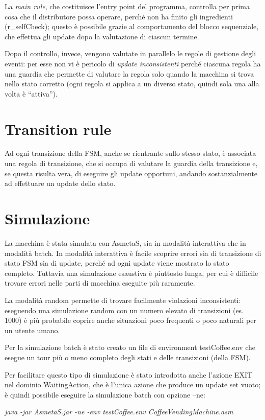 La \textit{main rule}, che costituisce l’entry point del programma, controlla per prima cosa che il distributore possa operare, perché non ha finito gli ingredienti (r_selfCheck); questo è possibile grazie al comportamento del blocco sequenziale, che effettua gli update dopo la valutazione di ciascun termine. 

Dopo il controllo, invece, vengono valutate in parallelo le regole di gestione degli eventi: per esse non vi è pericolo di \textit{update inconsistenti} perché ciascuna regola ha una guardia che permette di valutare la regola solo quando la macchina si trova nello stato corretto (ogni regola si applica a un diverso stato, quindi sola una alla volta è “attiva”).

\section{Transition rule}
Ad ogni transizione della FSM, anche se rientrante sullo stesso stato, è associata una regola di transizione, che si occupa di valutare la guardia della transizione e, se questa risulta vera, di eseguire gli update opportuni, andando sostanzialmente ad effettuare un update dello stato.


\section{Simulazione}
La macchina è stata simulata con AsmetaS, sia in modalità interattiva che in modalità batch.
In modalità interattiva è facile scoprire errori sia di transizione di stato FSM sia di update, perché ad ogni update viene mostrato lo stato completo. Tuttavia una simulazione esaustiva è piuttosto lunga, per cui è difficile trovare errori nelle parti di macchina eseguite più raramente.

La modalità random permette di trovare facilmente violazioni inconsistenti: eseguendo una simulazione random con un numero elevato di transizioni (es. 1000) è più probabile coprire anche situazioni poco frequenti o poco naturali per un utente umano.

Per la simulazione batch è stato creato un file di environment testCoffee.env che esegue un tour più o meno completo degli stati e delle transizioni (della FSM).

Per facilitare questo tipo di simulazione è stato introdotta anche l’azione EXIT nel dominio WaitingAction, che è l’unica azione che produce un update set vuoto; è quindi possibile eseguire la simulazione batch con opzione –ne:

\textit{java -jar AsmetaS.jar -ne -env testCoffee.env CoffeeVendingMachine.asm}


